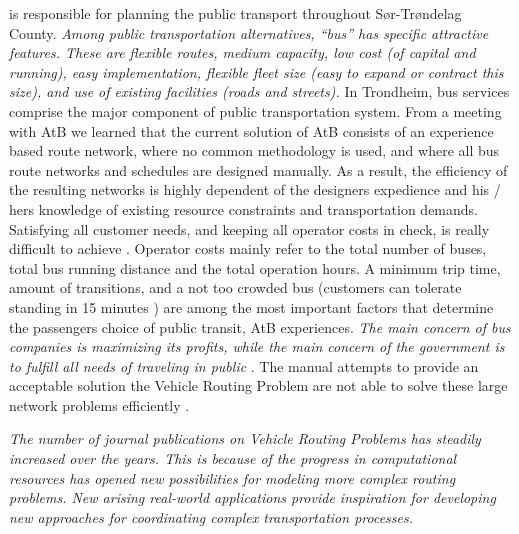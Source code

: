  \citet{website:atb} is responsible for planning the public transport throughout Sør-Trøndelag County. \textit{Among public transportation alternatives, “bus” has specific attractive features. These are flexible routes, medium capacity, low cost (of capital and running), easy implementation, flexible fleet size (easy to expand or contract this size), and use of existing facilities (roads and streets).} In Trondheim, bus services comprise the major component of public transportation system. From a meeting with AtB we learned that the current solution of AtB consists of an experience based route network, where no common methodology is used, and where all bus route networks and schedules are designed manually. As a result, the efficiency of the resulting networks is highly dependent of the designers expedience and his / hers knowledge of existing resource constraints and transportation demands. Satisfying all customer needs, and keeping all operator costs in check, is really difficult to achieve \citep{kechagiopoulos13}. Operator costs mainly refer to the total number of buses, total bus running distance and the total operation hours. A minimum trip time, amount of transitions, and a not too crowded bus (customers can tolerate standing in 15 minutes ) are among the most important factors that determine the passengers choice of public transit, AtB experiences.  \textit{The main concern of bus companies is maximizing its profits, while the main concern of the government is to fulfill all needs of traveling in public} \citep{kechagiopoulos13}. The manual attempts to provide an acceptable solution the Vehicle Routing Problem are not able to solve these large network problems efficiently \citep{kechagiopoulos13}. 

 \textit{The number of journal publications on Vehicle Routing Problems has steadily increased over the years. This is because of the progress in computational resources has opened new possibilities for modeling more complex routing problems. New arising real-world applications provide inspiration for developing new approaches for coordinating complex transportation processes.}  \citep{vehiclerouting}


















